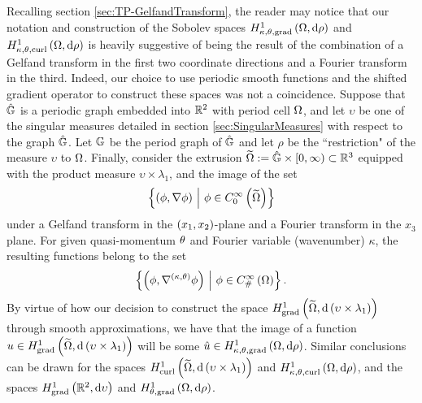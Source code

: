 Recalling section \ref{sec:TP-GelfandTransform}, the reader may notice that our notation and construction of the Sobolev spaces $H^1_{\kappa,\theta,\mathrm{grad}}\left( \Omega, \mathrm{d}\rho \right)$ and $H^1_{\kappa,\theta,\mathrm{curl}}\left( \Omega, \mathrm{d}\rho \right)$ is heavily suggestive of being the result of the combination of a Gelfand transform in the first two coordinate directions and a Fourier transform in the third.
Indeed, our choice to use periodic smooth functions and the shifted gradient operator to construct these spaces was not a coincidence.
Suppose that $\hat{\mathbb{G}}$ is a periodic graph embedded into $\mathbb{R}^2$ with period cell $\Omega$, and let $\upsilon$ be one of the singular measures detailed in section \ref{sec:SingularMeasures} with respect to the graph $\hat{\mathbb{G}}$.
Let $\mathbb{G}$ be the period graph of $\hat{\mathbb{G}}$ and let $\rho$ be the ``restriction" of the measure $\upsilon$ to $\Omega$.
Finally, consider the extrusion $\widetilde{\Omega}:=\hat{\mathbb{G}}\times[0,\infty)\subset\mathbb{R}^3$ equipped with the product measure $\upsilon\times\lambda_1$, and the image of the set
\begin{align*}
	\left\{  \left( \phi, \nabla\phi \right) \ \middle\vert \  \phi\in C^{\infty}_{0}\left( \widetilde{\Omega} \right)  \right\}
\end{align*}
under a Gelfand transform in the $\left( x_1,x_2 \right)$-plane and a Fourier transform in the $x_3$ plane.
For given quasi-momentum $\theta$ and Fourier variable (wavenumber) $\kappa$, the resulting functions belong to the set
\begin{align*}
	\left\{  \left( \phi, \nabla^{\left( \kappa, \theta \right)}\phi \right) \ \middle\vert \  \phi\in C^{\infty}_{\#}\left( \Omega \right)  \right\}.
\end{align*}
By virtue of how our decision to construct the space $H^1_\mathrm{grad}\left( \widetilde{\Omega}, \mathrm{d}\left( \upsilon\times\lambda_1 \right) \right)$ through smooth approximations, we have that the image of a function $u\in H^1_\mathrm{grad}\left( \widetilde{\Omega}, \mathrm{d}\left( \upsilon\times\lambda_1 \right) \right)$ will be some $\hat{u}\in H^1_{\kappa,\theta,\mathrm{grad}}\left( \Omega, \mathrm{d}\rho \right)$.
Similar conclusions can be drawn for the spaces $H^1_\mathrm{curl}\left( \widetilde{\Omega}, \mathrm{d}\left( \upsilon\times\lambda_1 \right) \right)$ and $H^1_{\kappa,\theta,\mathrm{curl}}\left( \Omega, \mathrm{d}\rho \right)$, and the spaces $H^1_\mathrm{grad}\left( \mathbb{R}^2, \mathrm{d}\upsilon \right)$ and $H^1_{\theta, \mathrm{grad}}\left( \Omega, \mathrm{d}\rho \right)$.
